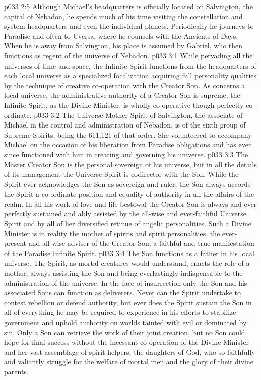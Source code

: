\vs p033 2:5 \pc Although Michael’s headquarters is officially located on Salvington, the capital of Nebadon, he spends much of his time visiting the constellation and system headquarters and even the individual planets. Periodically he journeys to Paradise and often to Uversa, where he counsels with the Ancients of Days. When he is away from Salvington, his place is assumed by Gabriel, who then functions as regent of the universe of Nebadon.
\vs p033 3:1 While pervading all the universes of time and space, the Infinite Spirit functions from the headquarters of each local universe as a specialized focalization acquiring full personality qualities by the technique of creative co\hyp{}operation with the Creator Son. As concerns a local universe, the administrative authority of a Creator Son is supreme; the Infinite Spirit, as the Divine Minister, is wholly co\hyp{}operative though perfectly co\hyp{}ordinate.
\vs p033 3:2 \pc The Universe Mother Spirit of Salvington, the associate of Michael in the control and administration of Nebadon, is of the sixth group of Supreme Spirits, being the 611,121 of that order. She volunteered to accompany Michael on the occasion of his liberation from Paradise obligations and has ever since functioned with him in creating and governing his universe.
\vs p033 3:3 \pc The Master Creator Son is the personal sovereign of his universe, but in all the details of its management the Universe Spirit is codirector with the Son. While the Spirit ever acknowledges the Son as sovereign and ruler, the Son always accords the Spirit a co\hyp{}ordinate position and equality of authority in all the affairs of the realm. In all his work of love and life bestowal the Creator Son is always and ever perfectly sustained and ably assisted by the all\hyp{}wise and ever\hyp{}faithful Universe Spirit and by all of her diversified retinue of angelic personalities. Such a Divine Minister is in reality the mother of spirits and spirit personalities, the ever\hyp{}present and all\hyp{}wise adviser of the Creator Son, a faithful and true manifestation of the Paradise Infinite Spirit.
\vs p033 3:4 \pc The Son functions as a father in his local universe. The Spirit, as mortal creatures would understand, enacts the role of a mother, always assisting the Son and being everlastingly indispensable to the administration of the universe. In the face of insurrection only the Son and his associated Sons can function as deliverers. Never can the Spirit undertake to contest rebellion or defend authority, but ever does the Spirit sustain the Son in all of everything he may be required to experience in his efforts to stabilize government and uphold authority on worlds tainted with evil or dominated by sin. Only a Son can retrieve the work of their joint creation, but no Son could hope for final success without the incessant co\hyp{}operation of the Divine Minister and her vast assemblage of spirit helpers, the daughters of God, who so faithfully and valiantly struggle for the welfare of mortal men and the glory of their divine parents.
